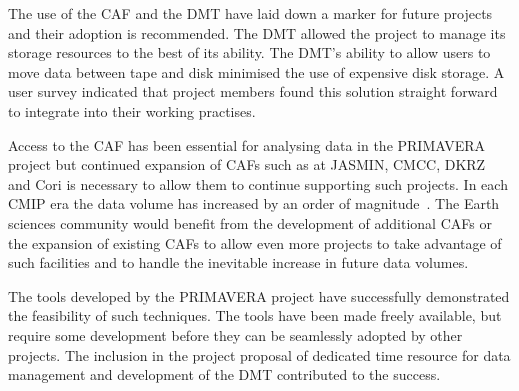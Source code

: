 \documentclass[gmd, manuscript]{copernicus}
\begin{document}
The use of the CAF and the DMT have laid down a marker for future projects and their adoption is recommended. The DMT allowed the project to manage its storage resources to the best of its ability. The DMT's ability to allow users to move data between tape and disk minimised the use of expensive disk storage. A user survey indicated that project members found this solution straight forward to integrate into their working practises.

Access to the CAF has been essential for analysing data in the PRIMAVERA project but continued expansion of CAFs such as at JASMIN, CMCC, DKRZ and Cori is necessary to allow them to continue supporting such projects. In each CMIP era the data volume has increased by an order of magnitude~\citep{gmd-11-3659-2018}. The Earth sciences community would benefit from the development of additional CAFs or the expansion of existing CAFs to allow even more projects to take advantage of such facilities and to handle the inevitable increase in future data volumes.

The tools developed by the PRIMAVERA project have successfully demonstrated the feasibility of such techniques. The tools have been made freely available, but require some development before they can be seamlessly adopted by other projects. The inclusion in the project proposal of dedicated time resource for data management and development of the DMT contributed to the success.









\end{document}
